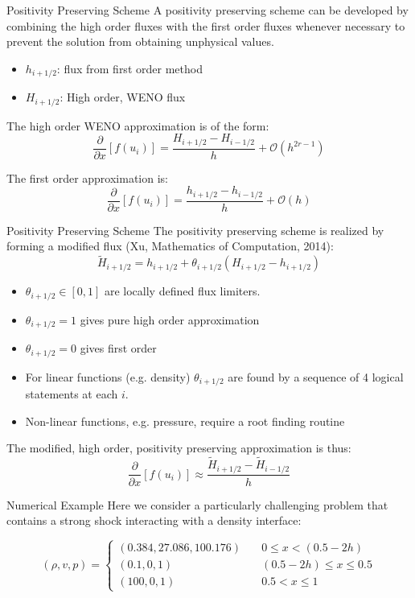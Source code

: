 \documentclass[10pt]{beamer}
\begin{document}
\begin{frame}{Positivity Preserving Scheme}
  A positivity preserving scheme can be developed by combining the high order fluxes with the first order fluxes whenever necessary to prevent the solution from obtaining unphysical values.
  \begin{itemize}
    \item $h_{i+1/2}$: flux from first order method
    \item $H_{i+1/2}$: High order, WENO flux
  \end{itemize}
  
  The high order WENO approximation is of the form:
  $$
  \frac{\partial}{\partial x}[f(u_i)] = \frac{H_{i+1 /2} - H_{i-1/2}}{h}+\mathcal{O}(h^{2r-1})
  $$

  The first order approximation is:
  $$
  \frac{\partial}{\partial x}[f(u_i)] = \frac{h_{i+1 /2} - h_{i-1/2}}{h}+\mathcal{O}(h)
  $$
\end{frame}


\begin{frame}{Positivity Preserving Scheme}
  The positivity preserving scheme is realized by forming a modified flux (Xu, Mathematics of Computation, 2014): 
  $$\tilde{H}_{i+1/2}=h_{i+1/2} + \theta_{i+1/2}(H_{i+1/2} - h_{i+1/2})$$
  
  \begin{itemize}
    \item $\theta_{i+1/2} \in [0,1]$ are locally defined flux limiters.
    \item $\theta_{i+1/2} =1$ gives pure high order approximation
    \item $\theta_{i+1/2} =0$ gives first order
    \item For linear functions (e.g. density) $\theta_{i+1/2}$ are found by a sequence of 4 logical statements at each $i$. 
    \item Non-linear functions, e.g. pressure, require a root finding routine
  \end{itemize}

  The modified, high order, positivity preserving approximation is thus:
  $$
  \frac{\partial}{\partial x}[f(u_i)] \approx \frac{\tilde{H}_{i+1 /2} - \tilde{H}_{i-1/2}}{h}
  $$
\end{frame}

\begin{frame}{Numerical Example}
  Here we consider a particularly challenging problem that contains a strong shock interacting with a density interface:

  $$
  (\rho, v, p) = 
  \begin{cases} 
  (0.384,27.086,100.176)& \quad 0 \leq x < (0.5 - 2h) \\
  (0.1,0,1)& \quad (0.5 - 2h) \leq x \leq 0.5\\
  (100,0,1)& \quad  0.5 < x \leq 1
  \end{cases}
  $$
\end{frame}
\end{document}
